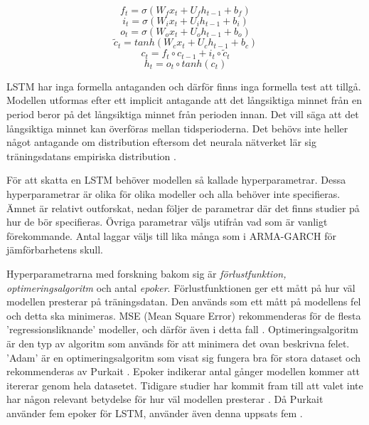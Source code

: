 \documentclass[11pt]{article}
\numberwithin{equation}{section}
\numberwithin{table}{section}
\numberwithin{figure}{section}
\begin{document}
\begin{equation}f_t = \sigma(W_f x_t + U_f h_{t-1} + b_f)\end{equation}
\begin{equation}i_t = \sigma(W_i x_t + U_i h_{t-1} + b_i)\end{equation}
\begin{equation}o_t = \sigma(W_o x_t + U_o h_{t-1} + b_o)\end{equation}
\begin{equation}\tilde{c}_t = tanh(W_c x_t + U_c h_{t-1} + b_c)\end{equation}
\begin{equation}c_t= f_t \circ c_{t-1} + i_t \circ \tilde{c}_t\end{equation}
\begin{equation}h_t= o_t \circ tanh(c_t)\end{equation}

LSTM har inga formella antaganden och därför finns inga formella test att tillgå. Modellen utformas efter ett implicit antagande att det långsiktiga minnet från en period beror på det långsiktiga minnet från perioden innan. Det vill säga att det långsiktiga minnet kan överföras mellan tidsperioderna. Det behövs inte heller något antagande om distribution eftersom det neurala nätverket lär sig träningsdatans empiriska distribution \parencite[][,s.478-559]{purkait2019hands}.

För att skatta en LSTM behöver modellen så kallade hyperparametrar. Dessa hyperparametrar är olika för olika modeller och alla behöver inte specifieras. Ämnet är relativt outforskat, nedan följer de parametrar där det finns studier på hur de bör specifieras. Övriga parametrar väljs utifrån vad som är vanligt förekommande. Antal laggar väljs till lika många som i ARMA-GARCH för jämförbarhetens skull.

Hyperparametrarna med forskning bakom sig är \textit{förlustfunktion, optimeringsalgoritm} och antal \textit{epoker}. Förlustfunktionen ger ett mått på hur väl modellen presterar på träningsdatan. Den används som ett mått på modellens fel och detta ska minimeras. MSE (Mean Square Error) rekommenderas för de flesta 'regressionsliknande' modeller, och därför även i detta fall \parencite[][,s.178 ff.]{purkait2019hands}. Optimeringsalgoritm är den typ av algoritm som används för att minimera det ovan beskrivna felet. 'Adam' är en optimeringsalgoritm som visat sig fungera bra för stora dataset och rekommenderas av Purkait \parencite*[][,s.178 ff.]{purkait2019hands}. Epoker indikerar antal gånger modellen kommer att itererar genom hela datasetet. Tidigare studier har kommit fram till att valet inte har någon relevant betydelse för hur väl modellen presterar \parencite{siaminamini2018forecasting}. Då Purkait använder fem epoker för LSTM, använder även denna uppsats fem \parencite[][,s.178 ff.]{purkait2019hands}.
\end{document}

